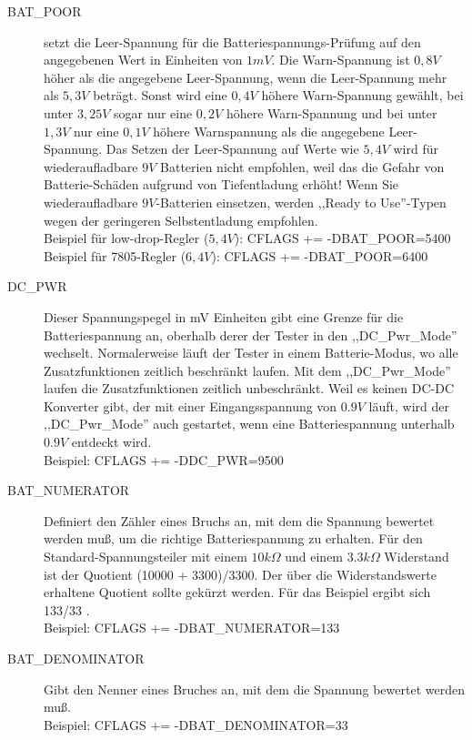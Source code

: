 \begin{description}
  \item[BAT\_POOR] setzt die Leer-Spannung für die Batteriespannungs-Prüfung auf den angegebenen Wert in Einheiten von \(1mV\).
Die Warn-Spannung ist \(0,8V\) höher als die angegebene Leer-Spannung, wenn die Leer-Spannung mehr als \(5,3V\) beträgt.
Sonst wird eine \(0,4V\) höhere Warn-Spannung gewählt, bei unter \(3,25V\) sogar nur eine \(0,2V\) höhere Warn-Spannung und
bei unter \(1,3V\) nur eine \(0,1V\) höhere Warnspannung als die angegebene Leer-Spannung.
Das Setzen der Leer-Spannung auf Werte wie \(5,4V\) wird für wiederaufladbare \(9V\) Batterien nicht empfohlen,
weil das die Gefahr von Batterie-Schäden aufgrund von Tiefentladung erhöht!
Wenn Sie wiederaufladbare \(9V\)-Batterien einsetzen, werden ,,Ready to Use''-Typen wegen der geringeren Selbstentladung empfohlen.\\
Beispiel für low-drop-Regler (\(5,4V\)): CFLAGS += -DBAT\_POOR=5400 \\
Beispiel für 7805-Regler (\(6,4V\)): CFLAGS += -DBAT\_POOR=6400

  \item[DC\_PWR] Dieser Spannungspegel in mV Einheiten gibt eine Grenze für die Batteriespannung an, oberhalb
derer der Tester in den ,,DC\_Pwr\_Mode'' wechselt. Normalerweise läuft der Tester in einem Batterie-Modus,
wo alle Zusatzfunktionen zeitlich beschränkt laufen.
Mit dem ,,DC\_Pwr\_Mode'' laufen die Zusatzfunktionen zeitlich unbeschränkt.
Weil es keinen DC-DC Konverter gibt, der mit einer Eingangsspannung von \(0.9V\) läuft,
wird der ,,DC\_Pwr\_Mode'' auch gestartet, wenn eine Batteriespannung unterhalb \(0.9V\) entdeckt wird.\\
Beispiel: CFLAGS += -DDC\_PWR=9500

 \item[BAT\_NUMERATOR] Definiert den Zähler eines Bruchs an, mit dem die Spannung bewertet werden muß,
um die richtige Batteriespannung zu erhalten. Für den Standard-Spannungsteiler mit einem \(10 k\Omega\) und 
einem \(3.3 k\Omega\) Widerstand ist der Quotient (10000 + 3300)/3300. 
Der über die Widerstandswerte erhaltene Quotient sollte gekürzt werden. 
Für das Beispiel ergibt sich 133/33 .\\
Beispiel: CFLAGS += -DBAT\_NUMERATOR=133

 \item[BAT\_DENOMINATOR] Gibt den Nenner eines Bruches an, mit dem die Spannung bewertet werden muß.\\
Beispiel: CFLAGS += -DBAT\_DENOMINATOR=33


\end{description}
